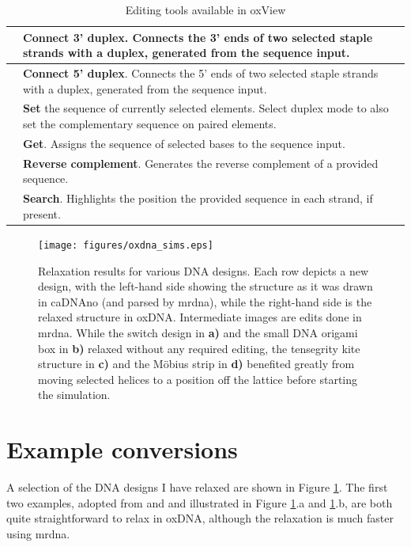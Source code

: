 \begin{table}[h!]
\begin{tabularx}{\textwidth} { >{\centering\arraybackslash}m{3em} | X }
 & \textbf{Connect 3' duplex}. Connects the 3' ends of two selected staple strands with a duplex, generated from the sequence input. \\ \hline
 & \textbf{Connect 5' duplex}. Connects the 5' ends of two selected staple strands with a duplex, generated from the sequence input. \\ \hline
 & \textbf{Set} the sequence of currently selected elements. Select duplex mode to also set the complementary sequence on paired elements. \\ \hline
 & \textbf{Get}. Assigns the sequence of selected bases to the sequence input.  \\ \hline
 & \textbf{Reverse complement}. Generates the reverse complement of a provided sequence. \\ \hline
 & \textbf{Search}. Highlights the position the provided sequence in each strand, if present. \\ \hline
\end{tabularx}

\caption{Editing tools available in oxView}
\label{table:edit_tools}
\end{table}



\begin{figure}
\centering\texttt{[image: figures/oxdna\_sims.eps]} 
\caption{Relaxation results for various DNA designs. Each row depicts a new design, with the left-hand side showing the structure as it was drawn in caDNAno (and parsed by mrdna), while the right-hand side is the relaxed structure in oxDNA. Intermediate images are edits done in mrdna. While the switch design\cite{gerling2015dynamic} in \textbf{a)} 
and the small DNA origami box\cite{zadegan2012smallbox} in \textbf{b)} relaxed without any required editing, the tensegrity kite structure \cite{liedl2010_kite} in \textbf{c)} and the Möbius strip\cite{han2010moebius} in \textbf{d)} benefited greatly from moving selected helices to a position off the lattice before starting the simulation.}
\label{fig:oxDNA_sims}\end{figure}

\section{Example conversions}
A selection of the DNA designs I have relaxed are shown in Figure \ref{fig:oxDNA_sims}. The first two examples, adopted from \cite{gerling2015dynamic} and \cite{zadegan2012smallbox} and illustrated in Figure \ref{fig:oxDNA_sims}.a and \ref{fig:oxDNA_sims}.b, are both quite straightforward to relax in oxDNA, although the relaxation is much faster using mrdna.

